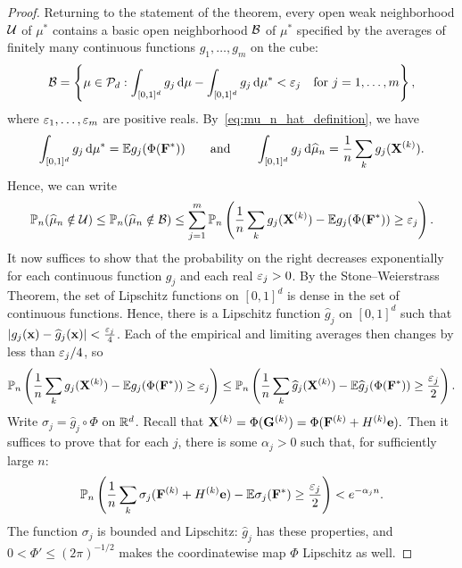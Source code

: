 \documentclass[11pt,letterpaper]{article}
\begin{document}
\begin{proof}
      Returning to the statement of the theorem, every open weak neighborhood $\mathcal U$ of $\mu^\ast$ contains a basic open neighborhood $\mathcal B$ of $\mu^\ast$ specified by the averages of finitely many continuous functions $g_1,\ldots,g_m$ on the cube:
      \[\mathcal B=\left\{\mu\in\mathcal{P}_{d}:\int_{[0,1]^{d}}g_{j}\,\mathrm d\mu-\int_{[0,1]^{d}}g_{j}\,\mathrm d\mu^\ast<\varepsilon_{j}\quad\text{for $j=1,\ldots,m$}\right\},\]%
      where $\varepsilon_{1},\ldots,\varepsilon_{m}$ are positive reals. By~\eqref{eq:mu_n_hat_definition}, we have
      \[\int_{[0,1]^{d}}g_{j}\,\mathrm d\mu^\ast=\mathbb E g_{j}(\Phi(\mathbf F^\ast))\qquad \text{and}\qquad \int_{[0,1]^{d}}g_{j}\,\mathrm d\widehat\mu_n=\frac{1}{n}\sum_{k} g_{j}(\mathbf X^{(k)}).\]
      Hence, we can write
      \[
            \mathbb P_n(\widehat\mu_n\notin\mathcal U) \le \mathbb P_n(\widehat\mu_n\notin\mathcal B) \le \sum_{j=1}^m \mathbb P_n\left(\frac{1}{n}\sum_{k} g_{j}(\mathbf X^{(k)})-\mathbb E g_{j}(\Phi(\mathbf F^\ast))\geq\varepsilon_{j}\right).
      \]
      It now suffices to show that the probability on the right decreases exponentially for each continuous function $g_{j}$ and each real $\varepsilon_{j}>0$. By the Stone--Weierstrass Theorem, the set of Lipschitz functions on $[0,1]^{d}$ is dense in the set of continuous functions. Hence, there is a Lipschitz function $\widehat{g}_{j}$ on $[0,1]^{d}$ such that $|g_{j}(\mathbf x)-\widehat{g}_{j}(\mathbf x)|<\frac{\varepsilon_{j}}{4}$. Each of the empirical and limiting averages then changes by less than $\varepsilon_j/4$, so
      \[\mathbb P_n\left(\frac{1}{n}\sum_{k} g_{j}(\mathbf X^{(k)})-\mathbb E g_{j}(\Phi(\mathbf F^\ast))\geq\varepsilon_{j}\right)\leq \mathbb P_n\left(\frac{1}{n}\sum_{k} \widehat{g}_{j}(\mathbf X^{(k)})-\mathbb E \widehat{g}_{j}(\Phi(\mathbf F^\ast))\geq\frac{\varepsilon_{j}}{2}\right).\]
      Write $\sigma_{j}=\widehat{g}_{j}\circ\Phi$ on $\mathbb R^d$.
      Recall that $\mathbf X^{(k)}=\Phi(\mathbf G^{(k)})=\Phi(\mathbf F^{(k)}+H^{(k)}\mathbf e).$ Then it suffices to prove that for each $j$, there is some $\alpha_{j}>0$ such that, for sufficiently large $n$:
      \[\mathbb P_n\left(\frac{1}{n}\sum_{k} \sigma_{j}(\mathbf F^{(k)}+H^{(k)}\mathbf e)-\mathbb E \sigma_{j}(\mathbf F^\ast)\geq\frac{\varepsilon_{j}}{2}\right)<e^{-\alpha_{j}n}.\]
      The function $\sigma_j$ is bounded and Lipschitz: $\widehat g_j$ has these properties, and $0<\Phi'\le(2\pi)^{-1/2}$ makes the coordinatewise map $\Phi$ Lipschitz as well.


\end{proof}
\end{document}
